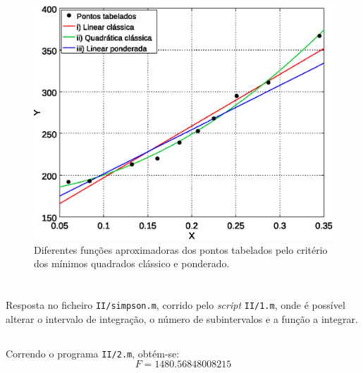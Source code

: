 \documentclass[portuguese, a4paper]{article}
\begin{document}
	\begin{figure}[H]
		\centering
		\includegraphics[width=0.80\linewidth]{I_fino}
		\captionsetup{width=0.80\linewidth}
		\caption{Diferentes funções aproximadoras dos pontos tabelados pelo critério dos mínimos quadrados clássico e ponderado.}
	\end{figure}

\newpage

\section{}
	\subsection{}
	\par
	Resposta no ficheiro \texttt{II/simpson.m}, corrido pelo \emph{script} \texttt{II/1.m}, onde é possível alterar o intervalo de integração, o número de subintervalos e a função a integrar.

	\subsection{}
	\subsubsection{}
	\par
	Correndo o programa \texttt{II/2.m}, obtém-se:
	$$F =  1480.56848008215$$
\end{document}
